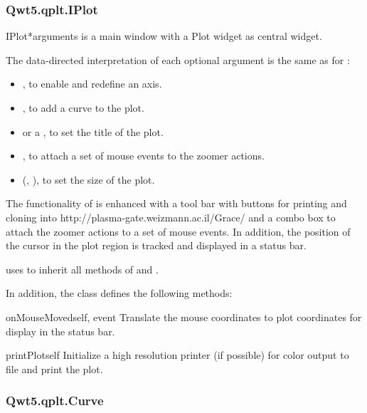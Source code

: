 \documentclass{manual}
\newcommand{\Grace}{\ulink{Grace}
  {http://plasma-gate.weizmann.ac.il/Grace/}}
\newcommand{\PyQwtLatestTarGz}{\ulink{PyQwt-5.0.1.tar.gz}
  {http://prdownloads.sourceforge.net/pyqwt/PyQwt-5.0.1.tar.gz?download}}
\newcommand{\Future}{
  \begin{notice}[warning]
    The documentation is for PyQwt-5.0.1 which has not yet been released. The
    latest release is \PyQwtLatestTarGz{} and refer to the documentation
    included in the latest release when using it.
  \end{notice}
}
\renewcommand{\Future}{}
\begin{document}
\subsubsection{Qwt5.qplt.IPlot \label{intro-qplt-iplot}}

\Future{}

\begin{classdesc}{IPlot}{*arguments}
   is a main window with a Plot widget as central widget.

  The data-directed interpretation of each optional argument is the
  same as for :
  \begin{itemize}
  \item
    , to enable and redefine an axis.
  \item
    , to add a curve to the plot.
  \item
     or a , to set the title of the plot.
  \item
    , to attach a set of mouse events to the zoomer actions.
  \item
    (, ), to set the size of the plot.
  \end{itemize}

  The functionality of  is enhanced with a tool bar with
  buttons for printing and cloning into \Grace{} and a combo box to attach
  the zoomer actions to a set of mouse events.
  In addition, the position of the cursor in the plot region is tracked
  and displayed in a status bar. 

   uses  to inherit all methods of
   and .


In addition, the class  defines the following methods:

\begin{methoddesc}[Plot]{onMouseMoved}{self, event}
Translate the mouse coordinates to plot coordinates for display in the status
bar.
\end{methoddesc}

\begin{methoddesc}[IPlot]{printPlot}{self}
Initialize a high resolution printer (if possible) for color output to file and
print the plot.
\end{methoddesc}

\end{classdesc}

\subsubsection{Qwt5.qplt.Curve \label{intro-qplt-curve}}
\end{document}
